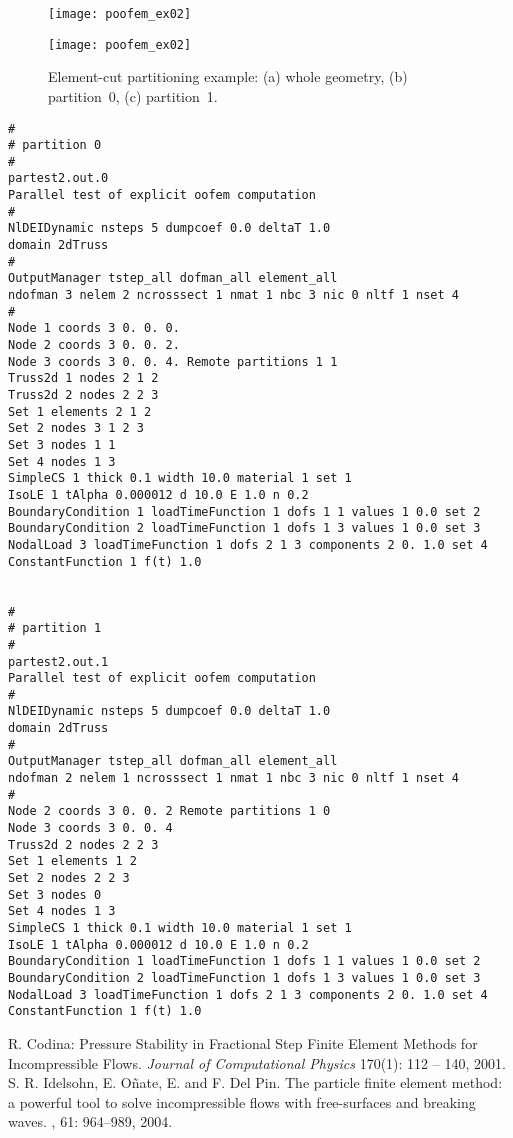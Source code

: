 \documentclass[a4paper]{report}
\begin{document}
\begin{figure}[htb]
\begin{htmlonly}
  \centerline{\texttt{[image: poofem\_ex02]}}
\end{htmlonly}
\centerline{\texttt{[image: poofem\_ex02]}}
\caption{Element-cut partitioning example: (a) whole geometry,
(b) partition~0, (c) partition~1.}
\label{elmentcut-ex02}
\end{figure}

\begin{verbatim}
#
# partition 0
#
partest2.out.0
Parallel test of explicit oofem computation
#
NlDEIDynamic nsteps 5 dumpcoef 0.0 deltaT 1.0
domain 2dTruss
#
OutputManager tstep_all dofman_all element_all
ndofman 3 nelem 2 ncrosssect 1 nmat 1 nbc 3 nic 0 nltf 1 nset 4
#
Node 1 coords 3 0. 0. 0.
Node 2 coords 3 0. 0. 2.
Node 3 coords 3 0. 0. 4. Remote partitions 1 1
Truss2d 1 nodes 2 1 2
Truss2d 2 nodes 2 2 3
Set 1 elements 2 1 2
Set 2 nodes 3 1 2 3
Set 3 nodes 1 1
Set 4 nodes 1 3
SimpleCS 1 thick 0.1 width 10.0 material 1 set 1
IsoLE 1 tAlpha 0.000012 d 10.0 E 1.0 n 0.2
BoundaryCondition 1 loadTimeFunction 1 dofs 1 1 values 1 0.0 set 2
BoundaryCondition 2 loadTimeFunction 1 dofs 1 3 values 1 0.0 set 3
NodalLoad 3 loadTimeFunction 1 dofs 2 1 3 components 2 0. 1.0 set 4
ConstantFunction 1 f(t) 1.0


#
# partition 1
#
partest2.out.1
Parallel test of explicit oofem computation
#
NlDEIDynamic nsteps 5 dumpcoef 0.0 deltaT 1.0
domain 2dTruss
#
OutputManager tstep_all dofman_all element_all
ndofman 2 nelem 1 ncrosssect 1 nmat 1 nbc 3 nic 0 nltf 1 nset 4
#
Node 2 coords 3 0. 0. 2 Remote partitions 1 0
Node 3 coords 3 0. 0. 4
Truss2d 2 nodes 2 2 3
Set 1 elements 1 2
Set 2 nodes 2 2 3
Set 3 nodes 0
Set 4 nodes 1 3
SimpleCS 1 thick 0.1 width 10.0 material 1 set 1
IsoLE 1 tAlpha 0.000012 d 10.0 E 1.0 n 0.2
BoundaryCondition 1 loadTimeFunction 1 dofs 1 1 values 1 0.0 set 2
BoundaryCondition 2 loadTimeFunction 1 dofs 1 3 values 1 0.0 set 3
NodalLoad 3 loadTimeFunction 1 dofs 2 1 3 components 2 0. 1.0 set 4
ConstantFunction 1 f(t) 1.0
\end{verbatim}

\begin{thebibliography}{9}
 R. Codina: Pressure Stability in Fractional Step Finite Element Methods for Incompressible Flows. {\em Journal of Computational Physics} 170(1): 112 -- 140, 2001.
 S. R. Idelsohn, E. O\~nate, E. and F. Del Pin.
\newblock The particle finite element method: a powerful tool to solve incompressible flows with free-surfaces and breaking waves.
, 61: 964--989, 2004.
\end{thebibliography}
\end{document}
